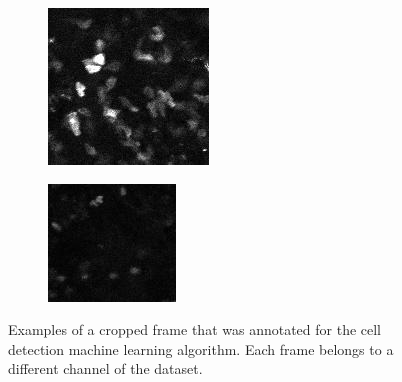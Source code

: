     \begin{figure}
    	\begin{subfigure}{.49\textwidth}
    	  \includegraphics[width=\textwidth]{images/seq_red_crop}
    	\end{subfigure}%
    	\hfill
    	\begin{subfigure}{.49\textwidth}
    	  \includegraphics[width=\textwidth]{images/seq_green_crop}
    	\end{subfigure}
    	\caption{Examples of a cropped frame that was annotated for the cell detection machine learning algorithm. Each frame belongs to a different channel of the dataset.}
        \label{fig:annotation_image}
    \end{figure}
    
